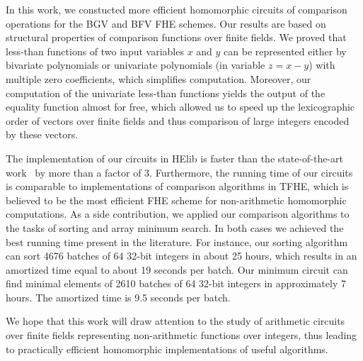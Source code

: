 In this work, we constucted more efficient homomorphic circuits of comparison operations for the BGV and BFV FHE schemes.
Our results are based on structural properties of comparison functions over finite fields.
We proved that less-than functions of two input variables $x$ and $y$ can be represented either by bivariate polynomials or univariate polynomials (in variable $z = x - y$) with multiple zero coefficients, which simplifies computation.
Moreover, our computation of the univariate less-than functions yields the output of the equality function almost for free, which allowed us to speed up the lexicographic order of vectors over finite fields and thus comparison of large integers encoded by these vectors.

The implementation of our circuits in HElib is faster than the state-of-the-art work~\cite{TLWRK20} by more than a factor of 3.
Furthermore, the running time of our circuits is comparable to implementations of comparison algorithms in TFHE, which is believed to be the most efficient FHE scheme for non-arithmetic homomorphic computations.
As a side contribution, we applied our comparison algorithms to the tasks of sorting and array minimum search.
In both cases we achieved the best running time present in the literature.
For instance, our sorting algorithm can sort 4676 batches of 64 32-bit integers in about 25 hours, which results in an amortized time equal to about 19 seconds per batch.
Our minimum circuit can find minimal elements of 2610 batches of 64 32-bit integers in approximately 7 hours. 
The amortized time is 9.5 seconds per batch.

We hope that this work will draw attention to the study of arithmetic circuits over finite fields representing non-arithmetic functions over integers, thus leading to practically efficient homomorphic implementations of useful algorithms.
